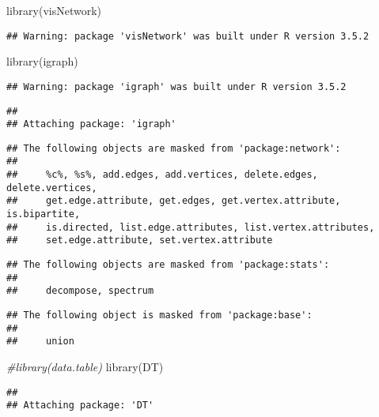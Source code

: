 \documentclass[
]{article}
\newenvironment{Shaded}{\begin{snugshade}}{\end{snugshade}}
\newcommand{\CommentTok}[1]{\textcolor[rgb]{0.56,0.35,0.01}{\textit{#1}}}
\newcommand{\FunctionTok}[1]{\textcolor[rgb]{0.00,0.00,0.00}{#1}}
\newcommand{\NormalTok}[1]{#1}
\begin{document}
\begin{Shaded}
\begin{Highlighting}[]
\FunctionTok{library}\NormalTok{(visNetwork)}
\end{Highlighting}
\end{Shaded}

\begin{verbatim}
## Warning: package 'visNetwork' was built under R version 3.5.2
\end{verbatim}

\begin{Shaded}
\begin{Highlighting}[]
\FunctionTok{library}\NormalTok{(igraph)}
\end{Highlighting}
\end{Shaded}

\begin{verbatim}
## Warning: package 'igraph' was built under R version 3.5.2
\end{verbatim}

\begin{verbatim}
## 
## Attaching package: 'igraph'
\end{verbatim}

\begin{verbatim}
## The following objects are masked from 'package:network':
## 
##     %c%, %s%, add.edges, add.vertices, delete.edges, delete.vertices,
##     get.edge.attribute, get.edges, get.vertex.attribute, is.bipartite,
##     is.directed, list.edge.attributes, list.vertex.attributes,
##     set.edge.attribute, set.vertex.attribute
\end{verbatim}

\begin{verbatim}
## The following objects are masked from 'package:stats':
## 
##     decompose, spectrum
\end{verbatim}

\begin{verbatim}
## The following object is masked from 'package:base':
## 
##     union
\end{verbatim}

\begin{Shaded}
\begin{Highlighting}[]
\CommentTok{\#library(data.table)}
\FunctionTok{library}\NormalTok{(DT)}
\end{Highlighting}
\end{Shaded}

\begin{verbatim}
## 
## Attaching package: 'DT'
\end{verbatim}
\end{document}
